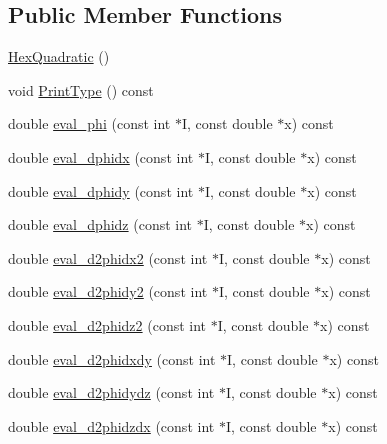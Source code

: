 \subsection*{Public Member Functions}
\begin{DoxyCompactItemize}
\item 
\mbox{\hyperlink{classfemus_1_1_hex_quadratic_a7eaa4a672f74d2cd96d488cdc548e843}{Hex\+Quadratic}} ()
\item 
void \mbox{\hyperlink{classfemus_1_1_hex_quadratic_a23f9ff89bfb12290b04237c5152334fd}{Print\+Type}} () const
\item 
double \mbox{\hyperlink{classfemus_1_1_hex_quadratic_a2e62701d96977559bfbdbc449c93fc3b}{eval\+\_\+phi}} (const int $\ast$I, const double $\ast$x) const
\item 
double \mbox{\hyperlink{classfemus_1_1_hex_quadratic_ad67c4453b00ce3cfb6ff4458fea56d42}{eval\+\_\+dphidx}} (const int $\ast$I, const double $\ast$x) const
\item 
double \mbox{\hyperlink{classfemus_1_1_hex_quadratic_aeb327519d776cb54e78bab68a3680693}{eval\+\_\+dphidy}} (const int $\ast$I, const double $\ast$x) const
\item 
double \mbox{\hyperlink{classfemus_1_1_hex_quadratic_ab75b6c916ae7176fa525bdd6d8bd37c4}{eval\+\_\+dphidz}} (const int $\ast$I, const double $\ast$x) const
\item 
double \mbox{\hyperlink{classfemus_1_1_hex_quadratic_a7a68a91e8865121d14f62b88f8756696}{eval\+\_\+d2phidx2}} (const int $\ast$I, const double $\ast$x) const
\item 
double \mbox{\hyperlink{classfemus_1_1_hex_quadratic_a99e2c105b81597d25f6c6f991c72235b}{eval\+\_\+d2phidy2}} (const int $\ast$I, const double $\ast$x) const
\item 
double \mbox{\hyperlink{classfemus_1_1_hex_quadratic_a0720366452fe8a95e1d54bbd46e9c174}{eval\+\_\+d2phidz2}} (const int $\ast$I, const double $\ast$x) const
\item 
double \mbox{\hyperlink{classfemus_1_1_hex_quadratic_a7725b6736d383a7df2147edef65779de}{eval\+\_\+d2phidxdy}} (const int $\ast$I, const double $\ast$x) const
\item 
double \mbox{\hyperlink{classfemus_1_1_hex_quadratic_a09580ff5b8c961f7c0cd929b415fc706}{eval\+\_\+d2phidydz}} (const int $\ast$I, const double $\ast$x) const
\item 
double \mbox{\hyperlink{classfemus_1_1_hex_quadratic_a327ecb8081384ae254b7c74ac70478ce}{eval\+\_\+d2phidzdx}} (const int $\ast$I, const double $\ast$x) const
\end{DoxyCompactItemize}
